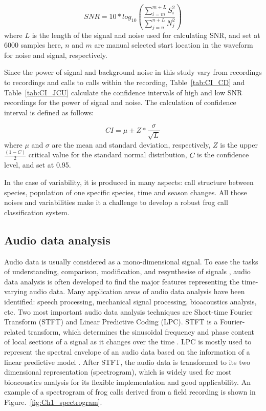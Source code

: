\begin{equation}
SNR=10*log_{10}(\frac{\sum_{i=m}^{m+L}S_{i}^2}{\sum_{j=n}^{n+L}N_{j}^2})
\end{equation}
where $L$ is the length of the signal and noise used for calculating SNR, and set at 6000 samples here, $n$ and $m$ are manual selected start location in the waveform for noise and signal, respectively. 



Since the power of signal and background noise in this study vary from recordings to recordings and calls to calls within the recording, Table~\ref{tab:CI_CD} and Table~\ref{tab:CI_JCU} calculate the confidence intervals of high and low SNR recordings for the power of signal and noise. The calculation of confidence interval is defined as follows:

\begin{equation}
CI=\mu \pm Z*\frac{\sigma}{\sqrt{L}}
\end{equation}
where $\mu$ and $\sigma$ are the mean and standard deviation, respectively, $Z$ is the upper $\frac{(1-C)}{2}$ critical value for the standard normal distribution, $C$ is the confidence level, and set at 0.95.



In the case of variability, it is produced in many aspects: call structure between species, population of one specific species, time and season changes. All those noises and variabilities make it a challenge to develop a robust frog call classification system. 






\subsection{Audio data analysis}
Audio data is usually considered as a mono-dimensional signal. To ease the tasks of understanding, comparison, modification, and resynthesise of signals \citep{rocchesso2003introduction}, audio data analysis is often developed to find the major features representing the time-varying audio data. Many application areas of audio data analysis have been identified: speech processing, mechanical signal processing, bioacoustics analysis, etc. Two most important audio data analysis techniques are Short-time Fourier Transform (STFT) and Linear Predictive Coding (LPC). STFT is a Fourier-related transform, which determines the sinusoidal frequency and phase content of local sections of a signal as it changes over the time \citep{allen1997short}. LPC is mostly used to represent the spectral envelope of an audio data based on the information of a linear predictive model \citep{deng2003speech}. After STFT, the audio data is transformed to its two dimensional representation (spectrogram), which is widely used for most bioacoustics analysis for its flexible implementation and good applicability.
An example of a spectrogram of frog calls derived from a field recording is shown in Figure.~\ref{fig:Ch1_spectrogram}.

